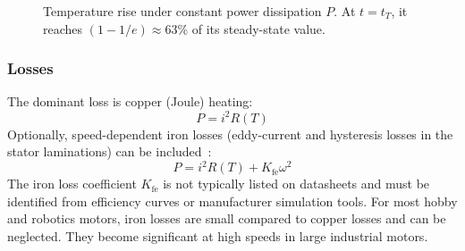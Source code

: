 \documentclass[10pt, a4paper, twocolumn]{article}
\begin{document}
\begin{figure}[ht]
\centering
{}%
\caption{Temperature rise under constant power dissipation $P$.
  At $t = t_T$, it reaches $(1-1/e) \approx 63\%$ of its steady-state value.}
\label{fig:thermal_response}
\end{figure}

\subsubsection{Losses}
\label{sec:thermal_losses}

The dominant loss is copper (Joule) heating:
\begin{equation*}
  P = i^2 R(T)
  \label{eq:copper_loss}
\end{equation*}
Optionally, speed-dependent iron losses (eddy-current and hysteresis losses in the stator laminations) can be included~\cite{hughes2019}:
\begin{equation*}
  P = i^2 R(T) + K_{\text{fe}} \omega^2
  \label{eq:total_loss}
\end{equation*}
The iron loss coefficient $K_{\text{fe}}$ is not typically listed on datasheets and must be identified from efficiency curves or manufacturer simulation tools. For most hobby and robotics motors, iron losses are small compared to copper losses and can be neglected. They become significant at high speeds in large industrial motors.
\end{document}
